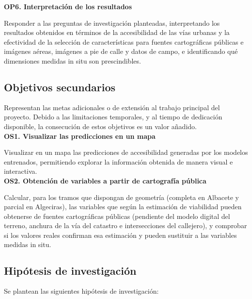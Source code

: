 \textbf{OP6. Interpretación de los resultados}

Responder a las preguntas de investigación planteadas, interpretando los resultados obtenidos en términos de la accesibilidad de las vías urbanas y la efectividad de la selección de características para fuentes cartográficas públicas e imágenes aéreas, imágenes a pie de calle y datos de campo, e identificando qué dimensiones medidas in situ son prescindibles.
\\



\subsection{Objetivos secundarios}
\label{subsec:objetivos-secundarios}

Representan las metas adicionales o de extensión al trabajo principal del proyecto. Debido a las limitaciones temporales, y al tiempo de dedicación disponible, la consecución de estos objetivos es un valor añadido.
\\

\textbf{OS1. Visualizar las predicciones en un mapa}

Visualizar en un mapa las predicciones de accesibilidad generadas por los modelos entrenados, permitiendo explorar la información obtenida de manera visual e interactiva.
\\

\textbf{OS2. Obtención de variables a partir de cartografía pública}

Calcular, para los tramos que dispongan de geometría (completa en Albacete y parcial en Algeciras), las variables que según la estimación de viabilidad pueden obtenerse de fuentes cartográficas públicas (pendiente del modelo digital del terreno, anchura de la vía del catastro e intersecciones del callejero), y comprobar si los valores reales confirman esa estimación y pueden sustituir a las variables medidas in situ.
\\

\subsection{Hipótesis de investigación}
Se plantean las siguientes hipótesis de investigación:


